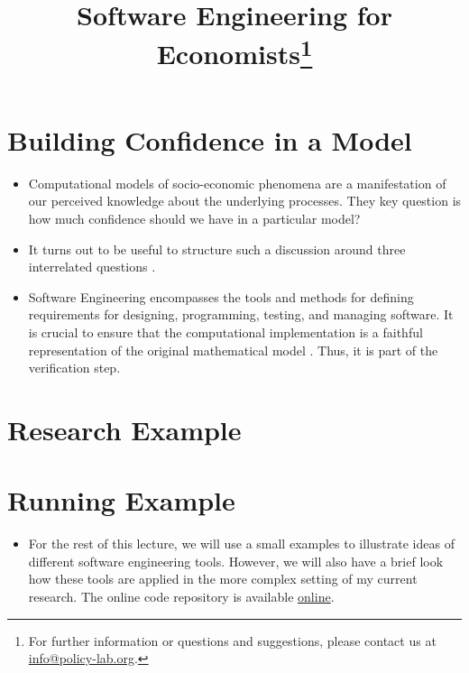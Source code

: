 
\title{Software Engineering for Economists\thanks{For further information or questions and suggestions, please contact us at \href{mailto: info@policy-lab.org}{info@policy-lab.org}.}}
\author{ }\date{ } 


\section{Building Confidence in a Model}

\begin{itemize}
\item Computational models of socio-economic phenomena are a manifestation of our perceived knowledge about the underlying processes. They key question is how much confidence should we have in a particular model? 
\item  It turns out to be useful to structure such a discussion around three interrelated questions \citet{Council.2012}.
\item  Software Engineering encompasses the tools and methods for defining requirements for designing, programming, testing, and managing software. It is crucial to ensure that the computational implementation is a faithful representation of the original mathematical model \citet{Oberkampf.2010}. Thus, it is part of the verification step.
\end{itemize}

\section{Research Example}


\section{Running Example}
\begin{itemize}
\item For the rest of this lecture, we will use a small examples to illustrate ideas of different software engineering tools. However, we will also have a brief look how these tools are applied in the more complex setting of my current research. The online code repository is available \href{https://github.com/robustToolbox/package}{online}.
\end{itemize}

